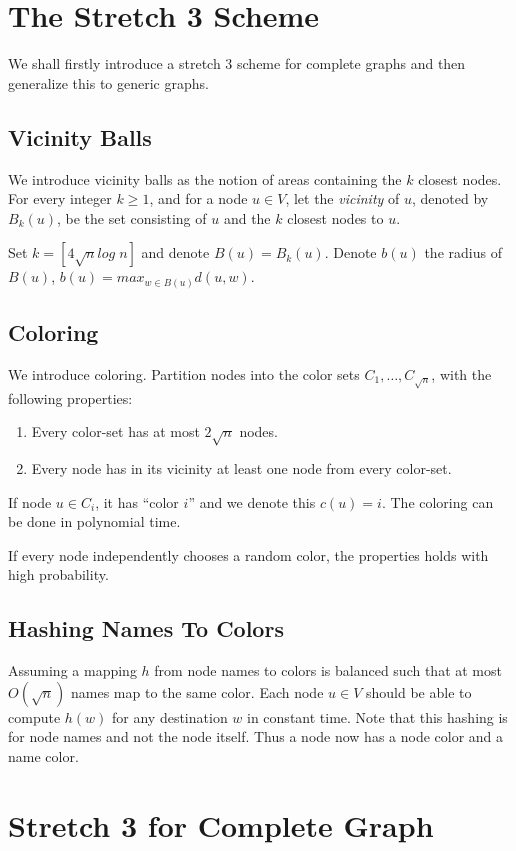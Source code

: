 \section{The Stretch 3 Scheme}
We shall firstly introduce a stretch 3 scheme for complete graphs and then generalize this to generic graphs.

\subsection{Vicinity Balls}
We introduce vicinity balls as the notion of areas containing the $k$ closest nodes. For every integer $k \geq 1$, and for a node $u \in V$, let the \textit{vicinity} of $u$, denoted by $B_k(u)$, be the set consisting of $u$ and the $k$ closest nodes to $u$.

Set $k=[4 \sqrt{n}log\; n]$ and denote $B(u) = B_k(u)$. Denote $b(u)$ the radius of $B(u)$, $b(u)=max_{w\in B(u)} d(u,w)$.

\subsection{Coloring}
We introduce coloring.
Partition nodes into the color sets $C_1,\dots,C_{\sqrt{n}}$, with the following properties:
\begin{enumerate}
    \item Every color-set has at most $2 \sqrt{n}$ nodes.
    \item Every node has in its vicinity at least one node from every color-set.
\end{enumerate}

If node $u\in C_i$, it has ``color $i$'' and we denote this $c(u)=i$. The coloring can be done in polynomial time.

If every node independently chooses a random color, the properties holds with high probability.

\subsection{Hashing Names To Colors}
Assuming a mapping $h$ from node names to colors is balanced such that at most $O(\sqrt{n})$ names map to the same color. Each node $u\in V$ should be able to compute $h(w)$ for any destination $w$ in constant time. Note that this hashing is for node names and not the node itself. Thus a node now has a node color and a name color.

\section{Stretch 3 for Complete Graph}
